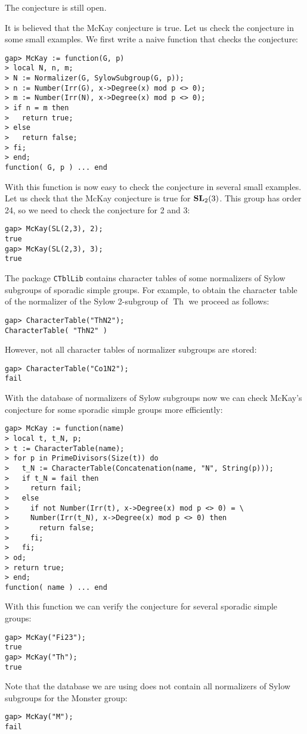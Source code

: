 The conjecture is still open. 

\begin{example}
\label{exa:McKay}
It is believed that the McKay conjecture is true.  Let us check the conjecture
in some small examples. We first write a naive 
function that checks the conjecture:
\begin{lstlisting}
gap> McKay := function(G, p)
> local N, n, m;
> N := Normalizer(G, SylowSubgroup(G, p));
> n := Number(Irr(G), x->Degree(x) mod p <> 0);
> m := Number(Irr(N), x->Degree(x) mod p <> 0);
> if n = m then
>   return true;
> else
>   return false;
> fi;
> end;
function( G, p ) ... end
\end{lstlisting}
With this function is now easy to check the conjecture in several small
examples. Let us check that the McKay conjecture is true for $\mathbf{SL}_2(3)$. This
group has order 24, so we need to check the conjecture for 2 and 3: 
\begin{lstlisting}
gap> McKay(SL(2,3), 2);
true
gap> McKay(SL(2,3), 3);
true
\end{lstlisting}

The package \lstinline{CTblLib} 
contains character tables of some normalizers of Sylow subgroups
of sporadic simple groups. 
For example, to obtain the character table of the 
normalizer of the Sylow 2-subgroup of $\operatorname{Th}$ 
we proceed as follows:
\begin{lstlisting}
gap> CharacterTable("ThN2");
CharacterTable( "ThN2" ) 
\end{lstlisting}
However, not all character tables of normalizer
subgroups are stored:
\begin{lstlisting}
gap> CharacterTable("Co1N2");
fail
\end{lstlisting}

With the database of normalizers of Sylow subgroups now 
we can check 
McKay's conjecture for some sporadic simple groups 
more efficiently:
\begin{lstlisting}
gap> McKay := function(name)
> local t, t_N, p;
> t := CharacterTable(name);
> for p in PrimeDivisors(Size(t)) do
>   t_N := CharacterTable(Concatenation(name, "N", String(p)));
>   if t_N = fail then
>     return fail;
>   else
>     if not Number(Irr(t), x->Degree(x) mod p <> 0) = \ 
>     Number(Irr(t_N), x->Degree(x) mod p <> 0) then
>       return false;
>     fi;
>   fi;
> od;
> return true;
> end;
function( name ) ... end
\end{lstlisting}
With this function we can verify the conjecture
for several sporadic simple groups:
\begin{lstlisting}
gap> McKay("Fi23");
true
gap> McKay("Th");
true
\end{lstlisting}
Note that the database we are using 
does not contain all normalizers 
of Sylow subgroups for the Monster
group:
\begin{lstlisting}
gap> McKay("M");
fail
\end{lstlisting}
\end{example}


